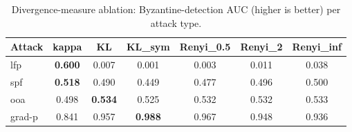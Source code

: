 \begin{table}[t]\centering\small
\caption{Divergence-measure ablation: Byzantine-detection AUC (higher is better) per attack type.}
\label{tab:divergence_ablation}
\begin{tabular}{lcccccc}
\toprule
Attack & kappa & KL & KL\_sym & Renyi\_0.5 & Renyi\_2 & Renyi\_inf \\
\midrule
lfp & \textbf{0.600} & 0.007 & 0.001 & 0.003 & 0.011 & 0.038 \\
spf & \textbf{0.518} & 0.490 & 0.449 & 0.477 & 0.496 & 0.500 \\
ooa & 0.498 & \textbf{0.534} & 0.525 & 0.532 & 0.532 & 0.533 \\
grad-p & 0.841 & 0.957 & \textbf{0.988} & 0.967 & 0.948 & 0.936 \\
\bottomrule
\end{tabular}
\end{table}
